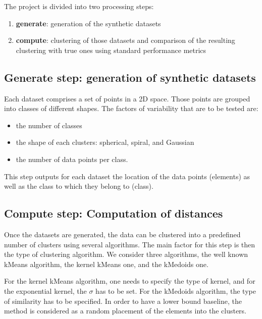 \documentclass[12pt,a4paper,fleqn]{tufte-handout}
\begin{document}
 The project is divided into two processing steps:
\begin{enumerate}
\item \textbf{generate}: generation of the synthetic datasets
\item \textbf{compute}: clustering of those datasets and comparison of the resulting clustering with true ones using standard performance metrics
\end{enumerate}

\subsection{\textbf{Generate step}: generation of synthetic datasets}



Each dataset comprises a set of points in a 2D space. Those points are grouped into classes of different shapes. The factors of variability that are to be tested are:
\begin{itemize}
\item the number of classes
\item the shape of each clusters: spherical, spiral, and Gaussian
\item the number of data points per class.
\end{itemize}

This step outputs for each dataset the location of the data points (elements) as well as the class to which they belong to (class).

\subsection{\textbf{Compute step}: Computation of distances}

Once the datasets are generated, the data can be clustered into a predefined number of clusters using several algorithms. The main factor for this step is then the type of clustering algorithm. We consider three algorithms, the well known kMeans algorithm\cite{macQueenBsmsp67}, the kernel kMeans one\cite{Girolami}, and the kMedoids one\cite{Kaufman1987}.

For the kernel kMeans algorithm, one needs to specify the type of kernel, and for the exponential kernel, the $\sigma$ has to be set. For the kMedoids algorithm, the type of similarity has to be specified. In order to have a lower bound baseline, the  method is considered as a random placement of the elements into the clusters.
\end{document}

